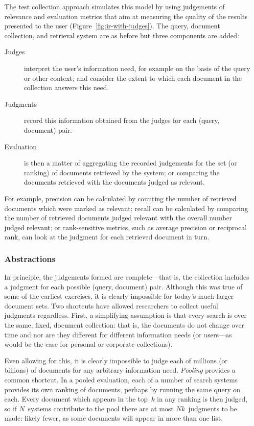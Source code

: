 The test collection approach simulates this model by using judgements of relevance and evaluation metrics that aim at measuring the quality of the results presented to the user  (Figure~\ref{fig:ir-with-judges}). The query, document collection, and retrieval system are as before but three components are added:

\begin{description}
	\item[Judges] interpret the user's information need, for example on the basis of the query or other context; and consider the extent to which each document in the collection answers this need.
	
	\item[Judgments] record this information obtained from the judges for each (query, document) pair.
	
	\item[Evaluation] is then a matter of aggregating the recorded judgements for the set (or ranking) of documents retrieved by the system; or comparing the documents retrieved with the documents judged as relevant.
\end{description}

For example, precision can be calculated by counting the number of retrieved documents which were marked as relevant; recall can be calculated by comparing the number of retrieved documents judged relevant with the overall number judged relevant; or rank-sensitive metrics, such as average precision or reciprocal rank, can look at the judgment for each retrieved document in turn.

\subsubsection{Abstractions}

In principle, the judgements formed are complete---that is, the collection includes a judgment for each possible (query, document) pair. Although this was true of some of the earliest exercises,  it is clearly impossible for today's much larger document sets. Two shortcuts have allowed researchers to collect useful judgments regardless.  First, a simplifying assumption is that every search is over the same, fixed, document collection: that is, the documents do not change over time and nor are they different for different information needs (or users---as would be the case for personal or corporate collections).

Even allowing for this, it is clearly impossible to judge each of millions (or billions) of documents for any arbitrary information need. \emph{Pooling} provides a common shortcut. In a pooled evaluation, each of a number of search systems provides its own ranking of documents, perhaps by running the same query on each. Every document which appears in the top~$k$ in any ranking is then judged, so if $N$~systems contribute to the pool there are at most $Nk$~judgments to be made: likely fewer, as some documents will appear in more than one list.


